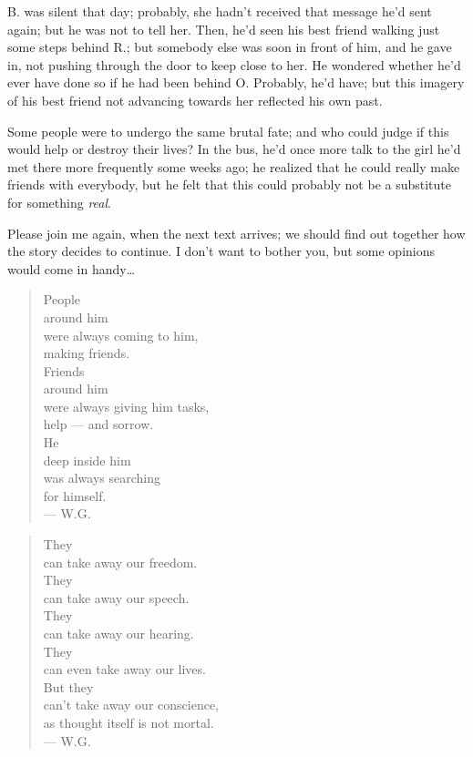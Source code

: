 B. was silent that day; probably, she hadn't received that message he'd sent again; but he was not to tell her. Then, he'd seen his best friend walking just some steps behind R.; but somebody else was soon in front of him, and he gave in, not pushing through the door to keep close to her. He wondered whether he'd ever have done so if he had been behind O. Probably, he'd have; but this imagery of his best friend not advancing towards her reflected his own past.

Some people were to undergo the same brutal fate; and who could judge if this would help or destroy their lives?
In the bus, he'd once more talk to the girl he'd met there more frequently some weeks ago; he realized that he could really make friends with everybody, but he felt that this could probably not be a substitute for something \emph{real}.

Please join me again, when the next text arrives; we should find out together how the story decides to continue. 
I don't want to bother you, but some opinions would come in handy\ldots

\begin{verse}
People \\
around him \\
were always coming to him, \\
making friends. \\
Friends \\
around him \\
were always giving him tasks, \\
help --- and sorrow. \\
He \\
deep inside him \\
was always searching \\
for himself. \\
--- W.G.
\end{verse}

\begin{verse}
They \\
can take away our freedom. \\
They \\
can take away our speech. \\
They \\
can take away our hearing. \\
They \\
can even take away our lives. \\
But they \\
can't take away our conscience, \\
as thought itself is not mortal. \\
--- W.G.
\end{verse}

